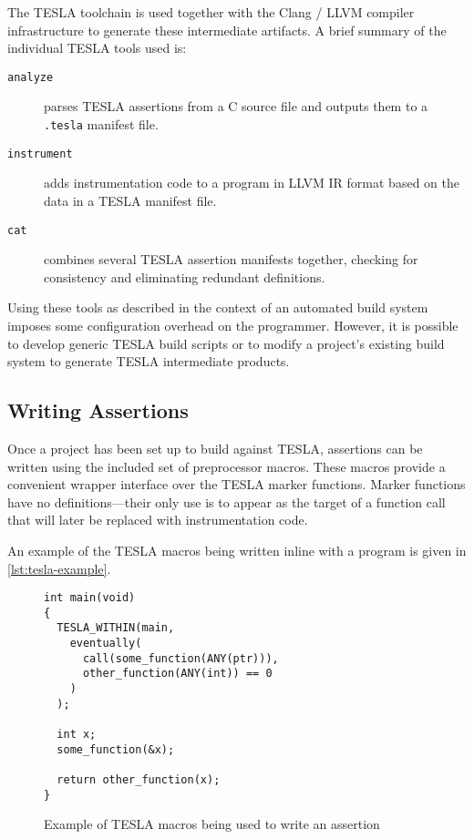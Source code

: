The TESLA toolchain is used together with the Clang / LLVM compiler
infrastructure to generate these intermediate artifacts. A brief summary of the
individual TESLA tools used is:

\begin{description}
  \item[\texttt{analyze}] parses TESLA assertions from a C source file and
    outputs them to a \texttt{.tesla} manifest file.
  \item[\texttt{instrument}] adds instrumentation code to a program in LLVM IR
    format based on the data in a TESLA manifest file.
  \item[\texttt{cat}] combines several TESLA assertion manifests together,
    checking for consistency and eliminating redundant definitions.
\end{description}

Using these tools as described in the context of an automated build system
imposes some configuration overhead on the programmer. However, it is
possible to develop generic TESLA build scripts or to modify a project's
existing build system to generate TESLA intermediate products.

\subsection{Writing Assertions}

Once a project has been set up to build against TESLA, assertions can be
written using the included set of preprocessor macros. These macros
provide a convenient wrapper interface over the TESLA marker functions.
Marker functions have no definitions---their only use is to appear as
the target of a function call that will later be replaced with
instrumentation code.

An example of the TESLA macros being written inline with a program is
given in \autoref{lst:tesla-example}.

\begin{figure}
  \begin{verbatim}
int main(void)
{
  TESLA_WITHIN(main,
    eventually(
      call(some_function(ANY(ptr))),
      other_function(ANY(int)) == 0
    )
  );

  int x;
  some_function(&x);

  return other_function(x);
}
  \end{verbatim}
  \caption{Example of TESLA macros being used to write an assertion}
  \label{lst:tesla-example}
\end{figure}

